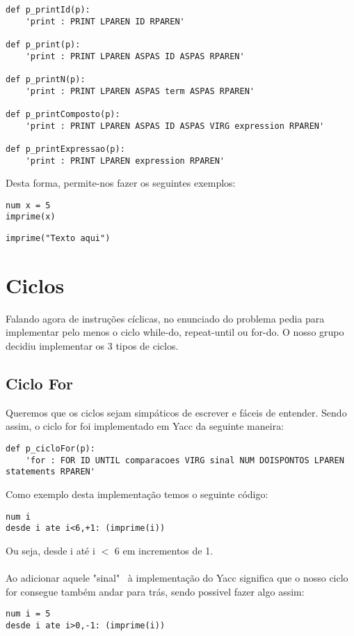 \documentclass[11pt,a4paper]{report}%
\begin{document}
\begin{verbatim}
def p_printId(p): 
    'print : PRINT LPAREN ID RPAREN'
    
def p_print(p): 
    'print : PRINT LPAREN ASPAS ID ASPAS RPAREN'
    
def p_printN(p): 
    'print : PRINT LPAREN ASPAS term ASPAS RPAREN'

def p_printComposto(p): 
    'print : PRINT LPAREN ASPAS ID ASPAS VIRG expression RPAREN'

def p_printExpressao(p):
    'print : PRINT LPAREN expression RPAREN'
\end{verbatim}

Desta forma, permite-nos fazer os seguintes exemplos:

\begin{lstlisting}[frame=single,numbers=none]
num x = 5
imprime(x)
\end{lstlisting}

\begin{lstlisting}[frame=single,numbers=none]
imprime("Texto aqui")
\end{lstlisting}


\section{Ciclos}

Falando agora de instruções cíclicas, no enunciado do problema pedia para implementar pelo menos o ciclo while-do, repeat-until ou for-do. O nosso grupo decidiu implementar os 3 tipos de ciclos.

\subsection{Ciclo For}
Queremos que os ciclos sejam simpáticos de escrever e fáceis de entender. Sendo assim, o ciclo for foi implementado em Yacc da seguinte maneira:

\begin{verbatim}
def p_cicloFor(p): 
    'for : FOR ID UNTIL comparacoes VIRG sinal NUM DOISPONTOS LPAREN statements RPAREN'
\end{verbatim}

Como exemplo desta implementação temos o seguinte código:
\\
\begin{lstlisting}[frame=single,numbers=none]
num i 
desde i ate i<6,+1: (imprime(i))
\end{lstlisting}


Ou seja, desde i até i $<$ 6 em incrementos de 1.
\\
\\
Ao adicionar aquele "sinal" \ à implementação do Yacc significa que o nosso ciclo for consegue também andar para trás, sendo possivel fazer algo assim:
\\
\begin{lstlisting}[frame=single,numbers=none]
num i = 5
desde i ate i>0,-1: (imprime(i))
\end{lstlisting}
\end{document}
